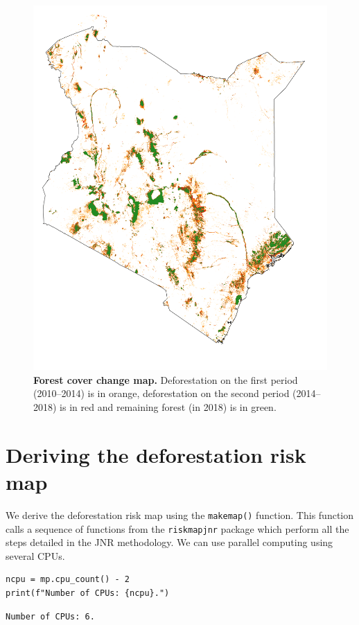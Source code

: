 \documentclass[paper=a4, 12pt, DIV=12]{scrartcl}
\begin{document}
\begin{figure}[H]
\centering
\includegraphics[width=0.8\linewidth]{outputs_kenya/fcc123.png}
\caption{\label{fig:org9213527}\textbf{Forest cover change map.} Deforestation on the first period (2010--2014) is in orange, deforestation on the second period (2014--2018) is in red and remaining forest (in 2018) is in green.}
\end{figure}

\section{Deriving the deforestation risk map}
\label{sec:org07ad532}

We derive the deforestation risk map using the \texttt{makemap()} function. This function calls a sequence of functions from the \texttt{riskmapjnr} package which perform all the steps detailed in the JNR methodology. We can use parallel computing using several CPUs.

\begin{verbatim}
ncpu = mp.cpu_count() - 2
print(f"Number of CPUs: {ncpu}.") 
\end{verbatim}

\begin{verbatim}
Number of CPUs: 6.
\end{verbatim}
\end{document}
